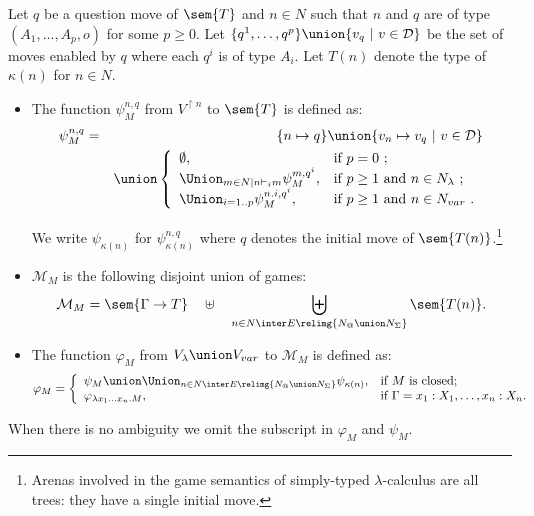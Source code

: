 \begin{definition}\rm
\label{def:phi_psi mapping} Let $q$ be a question move of $\sem{T}$
and $n \in N$ such that $n$ and $q$ are of type
$(A_1,\ldots,A_p,o)$ for some $p\geq 0$.  Let $\{ q^1, \ldots, q^p \} \union \{ v_q \ |
\ v \in \mathcal{D} \}$ be the set of moves enabled by $q$ where
each $q^i$ is of type $A_i$. Let $T(n)$ denote the type of $\kappa(n)$ for $n \in N$.
    \begin{itemize}[-]
    \item The function $\psi_M^{n,q}$ from $V^{\upharpoonright n}$ to $\sem{T}$ is defined as:
        \begin{eqnarray*}
        \psi^{n,q}_M &=& \{ n \mapsto q \} \union  \{ v_n \mapsto v_q \ | \ v \in \mathcal{D} \}\\
         &&\union \left\{
                        \begin{array}{ll}
                          \emptyset, & \hbox{if $p=0$\ ;} \\
                          \Union_{m \in N | n \vdash_i m} \psi_M^{m, q^i}, & \hbox{if $p\geq1$ and $n\in N_{\lambda}$\ ;} \\
                          \Union_{i=1..p} \psi_M^{n.i, q^i}, & \hbox{if $p\geq1$ and $n\in N_{var}$\ .}
                        \end{array}
                      \right.
        \end{eqnarray*}

        We write $\psi_{\kappa(n)}$ for  $\psi_{\kappa(n)}^{n,q}$ where $q$ denotes the initial move of
        $\sem{T(n)}$.\footnote{Arenas involved in the game semantics of simply-typed $\lambda$-calculus are all trees: they have a single initial move.}

\item $\mathcal{M}_M$ is the following disjoint union of games:
$$\mathcal{M}_M = \sem{\Gamma \rightarrow T} \quad \uplus \quad  \biguplus_{n \in N \inter E\relimg{N_@ \union N_\Sigma} } \sem{T(n)}.$$

    \item The function $\varphi_M$ from $V_\lambda \union V_{var}$ to $\mathcal{M}_M$ is defined as:
        \begin{equation*}
                \varphi_M = \left\{
                              \begin{array}{ll}
                                \psi_M \union \Union_{n \in N \inter E \relimg{N_@ \union N_\Sigma}} \psi_{\kappa(n)} , & \hbox{if $M$ is closed;} \\
                                \varphi_{\lambda x_1 \ldots x_n . M}, & \hbox{if $\Gamma = x_1 : X_1, \ldots, x_n : X_n$.}
                              \end{array}
                            \right.
        \end{equation*}
    \end{itemize}
When there is no ambiguity we omit the subscript in $\varphi_M$ and $\psi_M$.
\end{definition}



